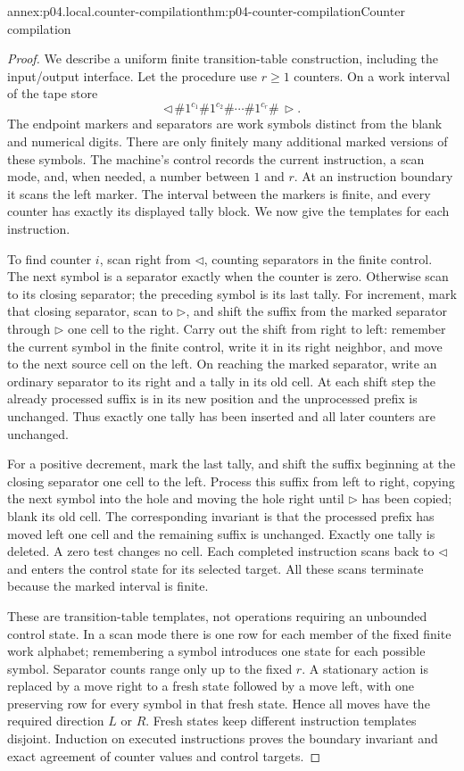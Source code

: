 \begin{annexitem}{annex:p04.local.counter-compilation}{thm:p04-counter-compilation}{Counter compilation}
\begin{proof}
We describe a uniform finite transition-table construction, including the
input/output interface.  Let the procedure use \(r\geq1\) counters.  On a
work interval of the tape store
\[
  \lhd\,\#1^{c_1}\#1^{c_2}\#\cdots\#1^{c_r}\#\,\rhd.
\]
The endpoint markers and separators are work symbols distinct from the
blank and numerical digits.  There are only finitely many additional
marked versions of these symbols.  The machine's control records the
current instruction, a scan mode, and, when needed, a number between
\(1\) and \(r\).  At an instruction boundary it scans the left marker.
The interval between the markers is finite, and every counter has exactly
its displayed tally block.  We now give the templates for each instruction.

To find counter \(i\), scan right from \(\lhd\), counting separators in
the finite control.  The next symbol is a separator exactly when the
counter is zero.  Otherwise scan to its closing separator; the preceding
symbol is its last tally.  For increment, mark that closing separator,
scan to \(\rhd\), and shift the suffix from the marked separator through
\(\rhd\) one cell to the right.  Carry out the shift from right to left:
remember the current symbol in the finite control, write it in its right
neighbor, and move to the next source cell on the left.  On reaching the
marked separator, write an ordinary separator to its right and a tally
in its old cell.  At each shift step the already processed suffix is in
its new position and the unprocessed prefix is unchanged.  Thus exactly
one tally has been inserted and all later counters are unchanged.

For a positive decrement, mark the last tally, and shift the suffix
beginning at the closing separator one cell to the left.  Process this
suffix from left to right, copying the next symbol into the hole and
moving the hole right until \(\rhd\) has been copied; blank its old cell.
The corresponding invariant is that the processed prefix has moved left
one cell and the remaining suffix is unchanged.  Exactly one tally is
deleted.  A zero test changes no cell.  Each completed instruction scans
back to \(\lhd\) and enters the control state for its selected target.
All these scans terminate because the marked interval is finite.

These are transition-table templates, not operations requiring an
unbounded control state.  In a scan mode there is one row for each member
of the fixed finite work alphabet; remembering a symbol introduces one
state for each possible symbol.  Separator counts range only up to the
fixed \(r\).  A stationary action is replaced by a move right to a fresh
state followed by a move left, with one preserving row for every symbol
in that fresh state.  Hence all moves have the required direction
\(L\) or \(R\).  Fresh states keep different instruction templates
disjoint.  Induction on executed instructions proves the boundary
invariant and exact agreement of counter values and control targets.


\end{proof}
\end{annexitem}
